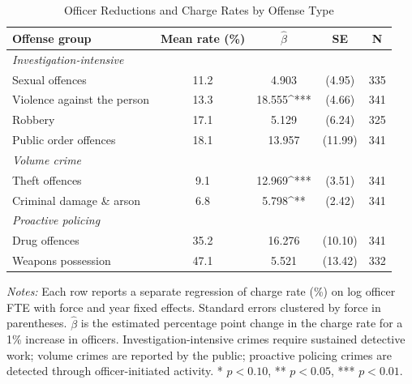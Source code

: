 \begin{table}[ht]
\centering
\caption{Officer Reductions and Charge Rates by Offense Type}
\label{tab:heterogeneity}
\begin{tabular}{lcccc}
\hline\hline
Offense group & Mean rate (\%) & $\hat{\beta}$ & SE & N \\
\hline
\textit{Investigation-intensive} & & & & \\
\quad Sexual offences & 11.2 & 4.903 & (4.95) & 335 \\
\quad Violence against the person & 13.3 & 18.555^{***} & (4.66) & 341 \\
\quad Robbery & 17.1 & 5.129 & (6.24) & 325 \\
\quad Public order offences & 18.1 & 13.957 & (11.99) & 341 \\
\textit{Volume crime} & & & & \\
\quad Theft offences & 9.1 & 12.969^{***} & (3.51) & 341 \\
\quad Criminal damage \& arson & 6.8 & 5.798^{**} & (2.42) & 341 \\
\textit{Proactive policing} & & & & \\
\quad Drug offences & 35.2 & 16.276 & (10.10) & 341 \\
\quad Weapons possession & 47.1 & 5.521 & (13.42) & 332 \\
\hline\hline
\end{tabular}
\begin{minipage}{0.92\textwidth}
\vspace{3pt}
\small\textit{Notes:} Each row reports a separate regression of charge rate (\%) on log officer FTE with force and year fixed effects. Standard errors clustered by force in parentheses. $\hat{\beta}$ is the estimated percentage point change in the charge rate for a 1\% increase in officers. Investigation-intensive crimes require sustained detective work; volume crimes are reported by the public; proactive policing crimes are detected through officer-initiated activity. * $p<0.10$, ** $p<0.05$, *** $p<0.01$.
\end{minipage}
\end{table}

